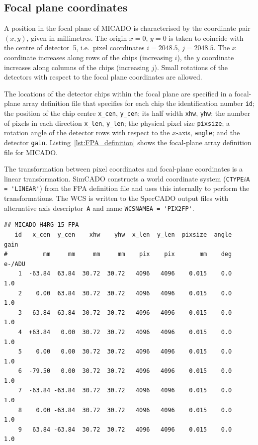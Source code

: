 \documentclass[a4paper,twoside,11pt]{article}
\newcommand{\micron}{\upmu\mathrm{m}}
\begin{document}
\subsection{Focal plane coordinates}

A position in the focal plane of MICADO is characterised by the
coordinate pair $(x, y)$, given in millimetres. The origin $x=0$,
$y=0$ is taken to coincide with the centre of detector~5, i.e.~pixel
coordinates $i=2048.5$, $j=2048.5$. The $x$ coordinate increases along
rows of the chips (increasing $i$), the $y$ coordinate increases along
columns of the chips (increasing $j$). Small rotations of the
detectors with respect to the focal plane coordinates are allowed.

The locations of the detector chips within the focal plane are
specified in a focal-plane array definition file that specifies for
each chip the identification number \lstinline{id}; the position of
the chip centre \lstinline{x_cen}, \lstinline{y_cen}; its half width
\lstinline{xhw}, \lstinline{yhw}; the number of pixels in each
direction \lstinline{x_len}, \lstinline{y_len}; the physical pixel
size \lstinline{pixsize}; a rotation angle of the detector rows with
respect to the $x$-axis, \lstinline{angle}; and the detector
\lstinline{gain}.  Listing~\ref{lst:FPA_definition} shows the
focal-plane array definition file for MICADO.

The transformation between pixel coordinates and focal-plane
coordinates is a linear transformation. SimCADO constructs a world
coordinate system (\lstinline{CTYPE}$i$\lstinline{A = 'LINEAR'}) from
the FPA definition file and uses this internally to perform the
transformations. The WCS is written to the SpecCADO output files with
alternative axis descriptor~\lstinline{A} and name
\lstinline{WCSNAMEA = 'PIX2FP'}.


\begin{lstlisting}[style=csh,float, caption=Focal plane array definition file for MICADO with nine HAWAII4RG chips with $15\,\micron$ pixels, label=lst:FPA_definition]
## MICADO H4RG-15 FPA
   id   x_cen  y_cen    xhw    yhw  x_len  y_len  pixsize  angle    gain
#          mm     mm     mm     mm    pix    pix       mm    deg  e-/ADU
    1  -63.84  63.84  30.72  30.72   4096   4096    0.015    0.0     1.0
    2    0.00  63.84  30.72  30.72   4096   4096    0.015    0.0     1.0
    3   63.84  63.84  30.72  30.72   4096   4096    0.015    0.0     1.0
    4  +63.84   0.00  30.72  30.72   4096   4096    0.015    0.0     1.0
    5    0.00   0.00  30.72  30.72   4096   4096    0.015    0.0     1.0
    6  -79.50   0.00  30.72  30.72   4096   4096    0.015    0.0     1.0
    7  -63.84 -63.84  30.72  30.72   4096   4096    0.015    0.0     1.0
    8    0.00 -63.84  30.72  30.72   4096   4096    0.015    0.0     1.0
    9   63.84 -63.84  30.72  30.72   4096   4096    0.015    0.0     1.0
\end{lstlisting}
\end{document}

